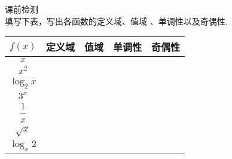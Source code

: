   \newtheorem*{Theorem}{定理}
  \makefront
\vspace{-1.5em}
\startexercise
\begin{exercise}{\heiti 课前检测}\\
  填写下表，写出各函数的定义域、值域 、单调性以及奇偶性.
  \begin{center}
    \renewcommand{\arraystretch}{1.4}
    \begin{tabular}{|c|c|c|c|c|}
      \hline
    $f(x)$&\mbox{\hspace{1.5em}定义域\hspace{1.5em}}&\mbox{\hspace{2em}值域\hspace{2em}}&\mbox{\hspace{8em}单调性\hspace{8em}}&\mbox{\hspace{1.2em}奇偶性\hspace{1.2em}}\\
      \hline
      $x$&&&&\\
      \hline
      $x^2$&&&&\\
      \hline
      $\log_2x$&&&&\\
      \hline
      $3^x$&&&&\\
      \hline
      $\dfrac{1}{x}$&&&&\\
      \hline
      $\sqrt{x}$&&&&\\
      \hline
      $\log_x2$&&&&\\
      \hline
    \end{tabular}\\
  \end{center}
\end{exercise}
